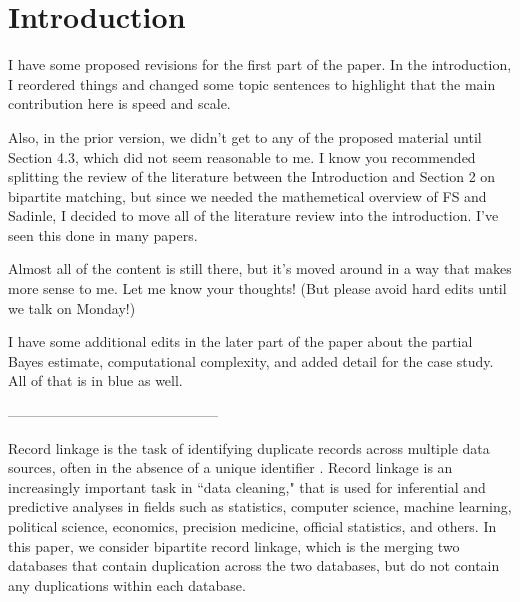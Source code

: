 \documentclass[12pt,letterpaper]{article}
\newcommand{\1}[1]{\mathbb{I}\!\left[#1\right]} %
\def\spacingset#1{\renewcommand{\baselinestretch}%
  {#1}\small\normalsize} \spacingset{1}
\begin{document}
\newpage
\spacingset{1.5}

\section{Introduction}
\label{sec:introduction}

{
	\color{blue}
	
	I have some proposed revisions for the first part of the paper. In the introduction, I reordered things and changed some topic sentences to highlight that the main contribution here is speed and scale. 
	
	Also, in the prior version, we didn't get to any of the proposed material until Section 4.3, which did not seem reasonable to me.
	I know you recommended splitting the review of the literature between the Introduction and Section 2 on bipartite matching, but since we needed the mathemetical overview of FS and Sadinle, I decided to move all of the literature review into the introduction. I've seen this done in many papers. 
	
	Almost all of the content is still there, but it's moved around in a way that makes more sense to me. Let me know your thoughts! (But please avoid hard edits until we talk on Monday!)
	
	I have some additional edits in the later part of the paper about the partial Bayes estimate, computational complexity, and added detail for the case study. All of that is in blue as well. 
	
	---------------------------------------------
	
	Record linkage is the task of identifying duplicate records across multiple data sources, often in the absence of a unique identifier \citep{christen_2012}. Record linkage is an increasingly important task in ``data cleaning," that is used for inferential and predictive analyses in fields such as statistics, computer science, machine learning, political science, economics, precision medicine, official statistics, and others. In this paper, we consider bipartite record linkage, which is the merging two databases that contain duplication across the two databases, but do not contain any duplications within each database. 
	
	
}
\end{document}
